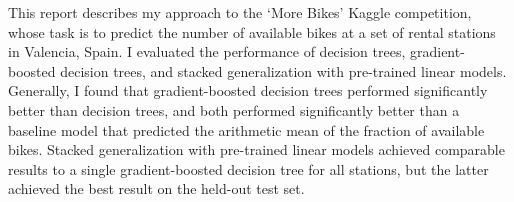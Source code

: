 This report describes my approach to the `More Bikes' Kaggle competition, whose task is
to predict the number of available bikes at a set of rental stations in Valencia,
Spain.
I evaluated the performance of decision trees, gradient-boosted decision trees, and
stacked generalization with pre-trained linear models.
Generally, I found that gradient-boosted decision trees performed significantly better
than decision trees, and both performed significantly better than a baseline model that
predicted the arithmetic mean of the fraction of available bikes.
Stacked generalization with pre-trained linear models achieved comparable results to a
single gradient-boosted decision tree for all stations, but the latter achieved the
best result on the held-out test set.
